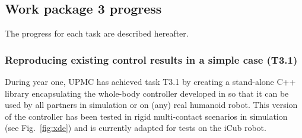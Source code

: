 \documentclass[12pt,a4paper,twoside]{article}
\begin{document}
\subsection{Work package 3 progress}

The progress for each task are described hereafter.

\subsubsection{Reproducing existing control results in a simple case (T3.1)}
During year one, UPMC has achieved task T3.1 by creating a stand-alone C++ library encapsulating the whole-body controller developed in \cite{salini2012} so that it can be used by all partners in simulation or on (any) real humanoid robot. This version of the controller has been tested in rigid multi-contact scenarios in simulation (see Fig.~\ref{fig:xde}) and is currently adapted for tests on the iCub robot.
\end{document}
